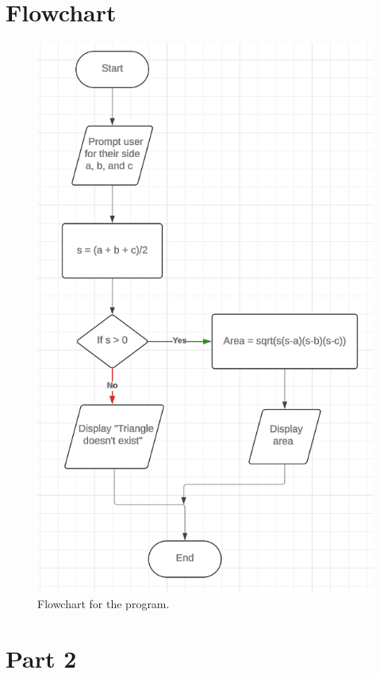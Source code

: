 \documentclass{article}
\begin{document}
\begin{flushleft}
  \section{Flowchart}
  \begin{figure}[!ht]
    \centering
    \includegraphics[scale=0.95]{Flowchart.png}
    \caption{Flowchart for the program.}
  \end{figure}
  \newpage
  \section{Part 2}

\end{flushleft}
\end{document}
